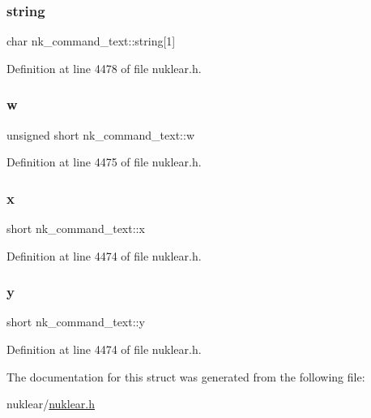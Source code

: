 \subsubsection{\texorpdfstring{string}{string}}
{\footnotesize\ttfamily char nk\+\_\+command\+\_\+text\+::string\mbox{[}1\mbox{]}}



Definition at line 4478 of file nuklear.\+h.

\mbox{\label{structnk__command__text_aeb1534c55f5f583788aa6baf8e89da0e}} 
\subsubsection{\texorpdfstring{w}{w}}
{\footnotesize\ttfamily unsigned short nk\+\_\+command\+\_\+text\+::w}



Definition at line 4475 of file nuklear.\+h.

\mbox{\label{structnk__command__text_aabc9267e7890ddcdd8caefa34cf0e220}} 
\subsubsection{\texorpdfstring{x}{x}}
{\footnotesize\ttfamily short nk\+\_\+command\+\_\+text\+::x}



Definition at line 4474 of file nuklear.\+h.

\mbox{\label{structnk__command__text_ace809f5ab5b1aadd3a97284fb5210a50}} 
\subsubsection{\texorpdfstring{y}{y}}
{\footnotesize\ttfamily short nk\+\_\+command\+\_\+text\+::y}



Definition at line 4474 of file nuklear.\+h.



The documentation for this struct was generated from the following file\+:\begin{DoxyCompactItemize}
\item 
nuklear/\mbox{\hyperlink{nuklear_8h}{nuklear.\+h}}\end{DoxyCompactItemize}
